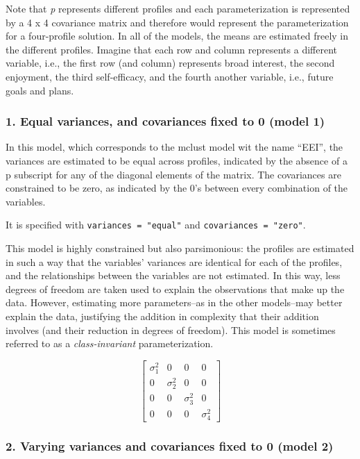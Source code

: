 \documentclass[man]{apa6}
\begin{document}
Note that \emph{p} represents different profiles and each parameterization is represented by a 4 x 4 covariance matrix and therefore would represent the parameterization for a four-profile solution. In all of the models, the means are estimated freely in the different profiles. Imagine that each row and column represents a different variable, i.e., the first row (and column) represents broad interest, the second enjoyment, the third self-efficacy, and the fourth another variable, i.e., future goals and plans.

\hypertarget{equal-variances-and-covariances-fixed-to-0-model-1}{%
\subsubsection{1. Equal variances, and covariances fixed to 0 (model 1)}\label{equal-variances-and-covariances-fixed-to-0-model-1}}

In this model, which corresponds to the mclust model wit the name \enquote{EEI}, the variances are estimated to be equal across profiles, indicated by the absence of a p subscript for any of the diagonal elements of the matrix. The covariances are constrained to be zero, as indicated by the 0's between every combination of the variables.

It is specified with \texttt{variances\ =\ "equal"} and \texttt{covariances\ =\ "zero"}.

This model is highly constrained but also parsimonious: the profiles are estimated in such a way that the variables' variances are identical for each of the profiles, and the relationships between the variables are not estimated. In this way, less degrees of freedom are taken used to explain the observations that make up the data. However, estimating more parameters--as in the other models--may better explain the data, justifying the addition in complexity that their addition involves (and their reduction in degrees of freedom). This model is sometimes referred to as a \emph{class-invariant} parameterization.

\[
\left[ \begin{matrix} { \sigma  }_{ 1 }^{ 2 } & 0 & 0 & 0 \\ 0 & { \sigma  }_{ 2 }^{ 2 } & 0 & 0 \\ 0 & 0 & { \sigma  }_{ 3 }^{ 2 } & 0 \\ 0 & 0 & 0 & { \sigma  }_{ 4 }^{ 2 } \end{matrix} \right] 
\]

\hypertarget{varying-variances-and-covariances-fixed-to-0-model-2}{%
\subsubsection{2. Varying variances and covariances fixed to 0 (model 2)}\label{varying-variances-and-covariances-fixed-to-0-model-2}}
\end{document}
